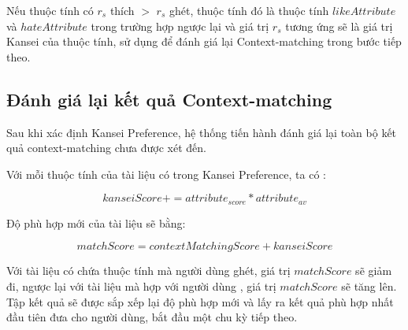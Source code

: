 Nếu thuộc tính có $r_s$ thích $>$ $r_s$ ghét, thuộc tính đó là thuộc tính $likeAttribute$ và $hateAttribute$ trong trường hợp ngược lại và giá trị $r_s$ tương ứng sẽ là giá trị Kansei của thuộc tính, sử dụng để đánh giá lại Context-matching trong bước tiếp theo.  
\subsection{Đánh giá lại kết quả Context-matching}

Sau khi xác định Kansei Preference, hệ thống tiến hành đánh giá lại toàn bộ kết quả context-matching chưa được xét đến.

Với mỗi thuộc tính của tài liệu có trong Kansei Preference, ta có : 

\begin{equation}
kanseiScore += attribute_{score} * attribute_{av} 
\end{equation}

Độ phù hợp mới của tài liệu sẽ bằng: 

\begin{equation}
matchScore = contextMatchingScore + kanseiScore
\end{equation}

Với tài liệu có chứa thuộc tính mà người dùng ghét, giá trị $matchScore$ sẽ giảm đi, ngược lại với tài liệu mà hợp với người dùng , giá trị $matchScore$ sẽ tăng lên. Tập kết quả sẽ được sắp xếp lại độ phù hợp mới và lấy ra kết quả phù hợp nhất đầu tiên đưa cho người dùng, bắt đầu một chu kỳ tiếp theo.